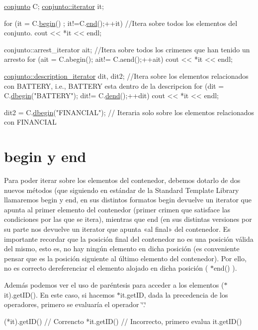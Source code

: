 \begin{DoxyCode}
\hyperlink{classconjunto}{conjunto} C;
\hyperlink{classconjunto_1_1iterator}{conjunto::iterator} it;

\textcolor{keywordflow}{for} (it = C.\hyperlink{classconjunto_abc5ad601995f1e28789defd4ba28075c}{begin}() ; it!=C.\hyperlink{classconjunto_afaee64c1f0f6087a0ae17ab6741a0723}{end}();++it) \textcolor{comment}{//Itera sobre todos los elementos del conjunto.}
  cout << *it << endl;

conjunto::arrest\_iterator ait; \textcolor{comment}{//Itera sobre todos los crimenes que han tenido un arresto}
\textcolor{keywordflow}{for} (ait = C.abegin(); ait!= C.aend();++ait) 
  cout << *it << endl;


\hyperlink{classconjunto_1_1description__iterator}{conjunto::description\_iterator} dit, dit2;  \textcolor{comment}{//Itera sobre los elementos
       relacionados con BATTERY, i.e., BATTERY esta dentro de la descripcion}
\textcolor{keywordflow}{for} (dit = C.\hyperlink{classconjunto_ac40bafea5d9dc529c96cf0e5977100c6}{dbegin}(\textcolor{stringliteral}{"BATTERY"}); dit!= C.\hyperlink{classconjunto_aaff3013d49c52c4d3177168338725756}{dend}();++dit) 
  cout << *it << endl;

dit2 = C.\hyperlink{classconjunto_ac40bafea5d9dc529c96cf0e5977100c6}{dbegin}(\textcolor{stringliteral}{"FINANCIAL"});  \textcolor{comment}{// Iteraria solo sobre los elementos relacionados con FINANCIAL}
\end{DoxyCode}
\hypertarget{index_ini}{}\section{begin y end}\label{index_ini}
Para poder iterar sobre los elementos del contenedor, debemos dotarlo de dos nuevos métodos (que siguiendo en estándar de la Standard Template Library llamaremos begin y end, en sus distintos formatos begin devuelve un iterator que apunta al primer elemento del contenedor (primer crimen que satisface las condiciones por las que se itera), mientras que end (en sus distintas versiones por su parte nos devuelve un iterator que apunta «al final» del contenedor. Es importante recordar que la posición final del contenedor no es una posición válida del mismo, esto es, no hay ningún elemento en dicha posición (es conveniente pensar que es la posición siguiente al último elemento del contenedor). Por ello, no es correcto dereferenciar el elemento alojado en dicha posición ( $\ast$end() ).

Además podemos ver el uso de paréntesis para acceder a los elementos ($\ast$it).get\+I\+D(). En este caso, si hacemos $\ast$it.get\+I\+D, dada la precedencia de los operadores, primero se evaluaría el operador \char`\"{}.\char`\"{} 
\begin{DoxyCode}
(*it).getID() \textcolor{comment}{// Correncto}
*it.getID() \textcolor{comment}{// Incorrecto, primero evalua it.getID()}
\end{DoxyCode}


